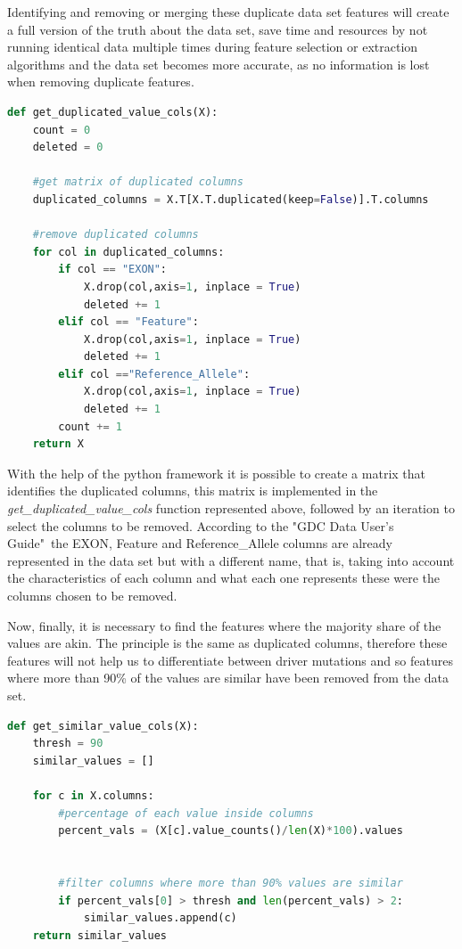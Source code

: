 Identifying and removing or merging these duplicate data set features will create a full version of the truth about the data set, save time and resources by not running identical data multiple times during feature selection or extraction algorithms and the data set becomes more accurate, as no information is lost when removing duplicate features.

\begin{lstlisting}[language=Python]
def get_duplicated_value_cols(X):
    count = 0
    deleted = 0
    
    #get matrix of duplicated columns
    duplicated_columns = X.T[X.T.duplicated(keep=False)].T.columns
    
    #remove duplicated columns
    for col in duplicated_columns:
        if col == "EXON":
            X.drop(col,axis=1, inplace = True)
            deleted += 1
        elif col == "Feature":
            X.drop(col,axis=1, inplace = True)
            deleted += 1
        elif col =="Reference_Allele":
            X.drop(col,axis=1, inplace = True)
            deleted += 1
        count += 1
    return X
\end{lstlisting}

With the help of the python framework it is possible to create a matrix that identifies the duplicated columns, this matrix is implemented in the \textit{get\_duplicated\_value\_cols} function represented above, followed by an iteration to select the columns to be removed. According to the "GDC Data User's Guide"\ the EXON, Feature and Reference\_Allele columns are already represented in the data set but with a different name, that is, taking into account the characteristics of each column and what each one represents these were the columns chosen to be removed.

Now, finally, it is necessary to find the features where the majority share of the values are akin. The principle is the same as duplicated columns, therefore these features will not help us to differentiate between driver mutations and so features where more than 90\% of the values are similar have been removed from the data set.

\begin{lstlisting}[language=Python]
def get_similar_value_cols(X):
    thresh = 90
    similar_values = []
    
    for c in X.columns:
        #percentage of each value inside columns
        percent_vals = (X[c].value_counts()/len(X)*100).values
        
        
        #filter columns where more than 90% values are similar
        if percent_vals[0] > thresh and len(percent_vals) > 2:
            similar_values.append(c)
    return similar_values
\end{lstlisting}

